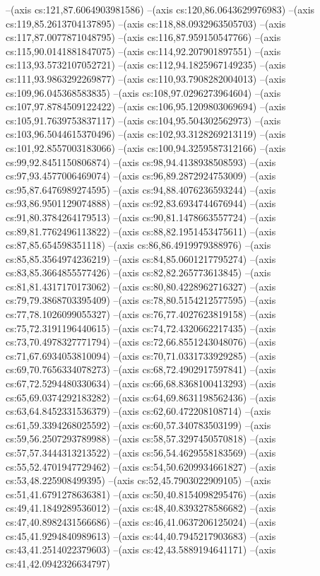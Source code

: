 --(axis cs:121,87.6064903981586)
--(axis cs:120,86.0643629976983)
--(axis cs:119,85.2613704137895)
--(axis cs:118,88.0932963505703)
--(axis cs:117,87.0077871048795)
--(axis cs:116,87.959150547766)
--(axis cs:115,90.0141881847075)
--(axis cs:114,92.207901897551)
--(axis cs:113,93.5732107052721)
--(axis cs:112,94.1825967149235)
--(axis cs:111,93.9863292269877)
--(axis cs:110,93.7908282004013)
--(axis cs:109,96.045368583835)
--(axis cs:108,97.0296273964604)
--(axis cs:107,97.8784509122422)
--(axis cs:106,95.1209803069694)
--(axis cs:105,91.7639753837117)
--(axis cs:104,95.504302562973)
--(axis cs:103,96.5044615370496)
--(axis cs:102,93.3128269213119)
--(axis cs:101,92.8557003183066)
--(axis cs:100,94.3259587312166)
--(axis cs:99,92.8451150806874)
--(axis cs:98,94.4138938508593)
--(axis cs:97,93.4577006469074)
--(axis cs:96,89.2872924753009)
--(axis cs:95,87.6476989274595)
--(axis cs:94,88.4076236593244)
--(axis cs:93,86.9501129074888)
--(axis cs:92,83.6934744676944)
--(axis cs:91,80.3784264179513)
--(axis cs:90,81.1478663557724)
--(axis cs:89,81.7762496113822)
--(axis cs:88,82.1951453475611)
--(axis cs:87,85.654598351118)
--(axis cs:86,86.4919979388976)
--(axis cs:85,85.3564974236219)
--(axis cs:84,85.0601217795274)
--(axis cs:83,85.3664855577426)
--(axis cs:82,82.265773613845)
--(axis cs:81,81.4317170173062)
--(axis cs:80,80.4228962716327)
--(axis cs:79,79.3868703395409)
--(axis cs:78,80.5154212577595)
--(axis cs:77,78.1026099055327)
--(axis cs:76,77.4027623819158)
--(axis cs:75,72.3191196440615)
--(axis cs:74,72.4320662217435)
--(axis cs:73,70.4978327771794)
--(axis cs:72,66.8551243048076)
--(axis cs:71,67.6934053810094)
--(axis cs:70,71.0331733929285)
--(axis cs:69,70.7656334078273)
--(axis cs:68,72.4902917597841)
--(axis cs:67,72.5294480330634)
--(axis cs:66,68.8368100413293)
--(axis cs:65,69.0374292183282)
--(axis cs:64,69.8631198562436)
--(axis cs:63,64.8452331536379)
--(axis cs:62,60.472208108714)
--(axis cs:61,59.3394268025592)
--(axis cs:60,57.340783503199)
--(axis cs:59,56.2507293789988)
--(axis cs:58,57.3297450570818)
--(axis cs:57,57.3444313213522)
--(axis cs:56,54.4629558183569)
--(axis cs:55,52.4701947729462)
--(axis cs:54,50.6209934661827)
--(axis cs:53,48.225908499395)
--(axis cs:52,45.7903022909105)
--(axis cs:51,41.6791278636381)
--(axis cs:50,40.8154098295476)
--(axis cs:49,41.1849289536012)
--(axis cs:48,40.8393278586682)
--(axis cs:47,40.8982431566686)
--(axis cs:46,41.0637206125024)
--(axis cs:45,41.9294840989613)
--(axis cs:44,40.7945217903683)
--(axis cs:43,41.2514022379603)
--(axis cs:42,43.5889194641171)
--(axis cs:41,42.0942326634797)
